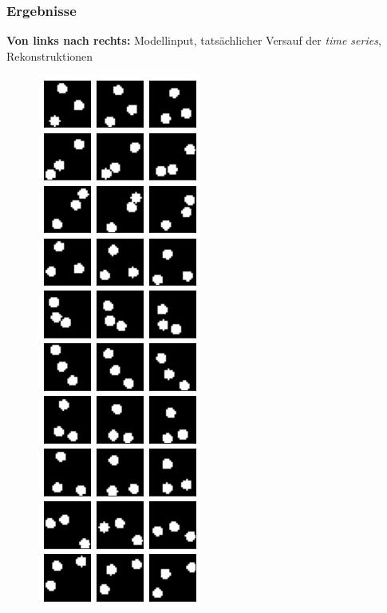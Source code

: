 \begin{frame}
\begin{figure}[h!]
\begin{minipage}{0.35\textwidth}
	\end{minipage}
\end{figure}
\end{frame}




\begin{frame}
\frametitle{Ergebnisse}
\textbf{Von links nach rechts:} Modellinput, tatsächlicher Versauf der \emph{time series}, Rekonstruktionen 
\begin{figure}[h!]
	\begin{minipage}{0.115\textwidth}
		\center{}
		\includegraphics[scale=0.19]{Bilder/bouncingBalls_ODEorig1}

\end{minipage}
\end{figure}
\end{frame}
